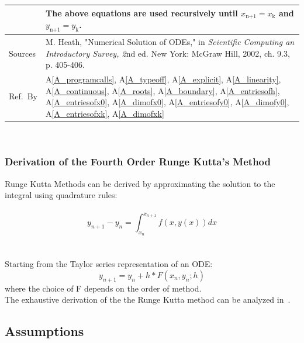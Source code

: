 \documentclass[12pt]{article}
\newcommand{\colAwidth}{0.13\textwidth}
\newcommand{\colBwidth}{0.82\textwidth}
\newcommand{\aref}[1]{A\ref{#1}}
\begin{document}
\begin{minipage}{\textwidth}
\begin{tabular}{| p{\colAwidth} | p{\colBwidth}|}
  & The above equations are used recursively until $x_\text{n+1} = x_\text{k}$ and $y_\text{n+1} =
  y_\text{k}$.
  \\
  \hline
  Sources&
        M. Heath, "Numerical Solution of ODEs," in \textit{Scientific Computing an
        Introductory Survey, 2}nd ed. New York: McGraw Hill, 2002, ch. 9.3, p. 405-406.
        ~\cite{Heath2002} 
  \\
  \hline
  Ref.\ By & \aref{A_programcalls},
  \aref{A_typeoff}, \aref{A_explicit}, \aref{A_linearity},
  \aref{A_continuous}, \aref{A_roots}, \aref{A_boundary}, \aref{A_entriesofh}, 
  \aref{A_entriesofx0}, \aref{A_dimofx0}, \aref{A_entriesofy0}, \aref{A_dimofy0},
  \aref{A_entriesofxk}, \aref{A_dimofxk}

  \\
  \hline
\end{tabular}
\end{minipage}\\

\subsubsection*{Derivation of the Fourth Order Runge Kutta's Method}

Runge Kutta Methods can be derived by approximating the solution to the integral using quadrature rules:\\
\\
\hspace*{2ex}$$y_{n+1} - y_n = \int_{x_n}^{x_{n+1}} f(x, y(x)) dx$$\\
\\
Starting from the Taylor series representation of an ODE:
\\
\hspace*{2ex}$$y_{n+1} = y_n + h*F(x_n, y_n; h)$$
where the choice of F depends on the order of method.
\\
The exhaustive derivation of the the Runge Kutta method can be analyzed in~\cite{Nagle2000}.
\\

\subsection{Assumptions} \label{sec_Assumptions}
\end{document}
